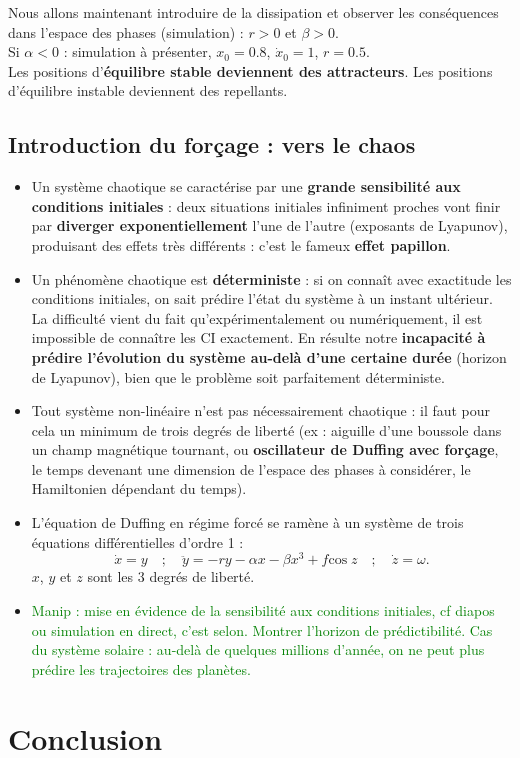 \documentclass[11pt,a4paper]{report}
\begin{document}
Nous allons maintenant introduire de la dissipation et observer les conséquences dans l'espace des phases (simulation) : $r > 0$ et $\beta > 0$.\\

Si $\alpha < 0$ : simulation à présenter, $x_0 = 0.8$, $\dot{x}_0 = 1$, $r = 0.5$.\\

Les positions d'\textbf{équilibre stable deviennent des attracteurs}. Les positions d'équilibre instable deviennent des repellants.\\


\subsection{Introduction du forçage : vers le chaos}

\begin{itemize}
	\item Un système chaotique se caractérise par une \textbf{grande sensibilité aux conditions initiales} : deux situations initiales infiniment proches vont finir par \textbf{diverger exponentiellement} l'une de l'autre (exposants de Lyapunov), produisant des effets très différents : c'est le fameux \textbf{effet papillon}.
	
	\item Un phénomène chaotique est \textbf{déterministe} : si on connaît avec exactitude les conditions initiales, on sait prédire l'état du système à un instant ultérieur. La difficulté vient du fait qu'expérimentalement ou numériquement, il est impossible de connaître les CI exactement. En résulte notre \textbf{incapacité à prédire l'évolution du système au-delà d'une certaine durée} (horizon de Lyapunov), bien que le problème soit parfaitement déterministe.
	
	\item Tout système non-linéaire n'est pas nécessairement chaotique : il faut pour cela un minimum de trois degrés de liberté (ex : aiguille d'une boussole dans un champ magnétique tournant, ou \textbf{oscillateur de Duffing avec forçage}, le temps devenant une dimension de l'espace des phases à considérer, le Hamiltonien dépendant du temps).
	
	\item L'équation de Duffing en régime forcé se ramène à un système de trois équations 		différentielles d'ordre 1 :
	\begin{equation}
		\dot{x} = y \quad;\quad \ddot{y} = -ry -\alpha x - \beta x^3 + f \text{cos}\;z \quad;			\quad \dot{z} = \omega.
	\end{equation}
	$x$, $y$ et $z$ sont les 3 degrés de liberté.
	
	\item \textcolor{green}{Manip : mise en évidence de la sensibilité aux conditions 				initiales, cf diapos ou simulation en direct, c'est selon. Montrer l'horizon de 				prédictibilité. Cas du système solaire : au-delà de quelques millions d'année, on ne peut 		plus prédire les trajectoires des planètes.}
\end{itemize}

\section*{Conclusion}
\end{document}
